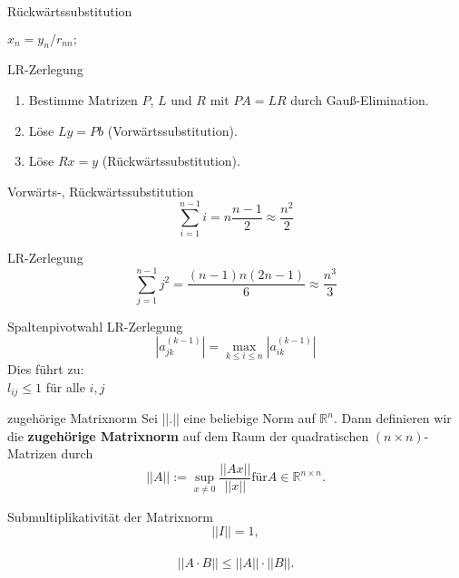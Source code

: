 
\begin{flashcard}[Algorithmus]{Rückwärtssubstitution}
\begin{algorithm}[H]
	$x_n = y_n/r_{nn};$\\
\end{algorithm}
\end{flashcard}

\begin{flashcard}[Algorithmus]{LR-Zerlegung}
\begin{enumerate}
	\item Bestimme Matrizen $P$, $L$ und $R$ mit $PA = LR$ durch Gauß-Elimination.
	\item Löse $Ly = Pb$ (Vorwärtssubstitution).
	\item Löse $Rx = y$ (Rückwärtssubstitution).
\end{enumerate}
\end{flashcard}

\begin{flashcard}[Aufwand]{Vorwärts-, Rückwärtssubstitution}
$$\sum_{i=1}^{n-1}i = n \frac{n-1}{2} \approx \frac{n^2}{2}$$
\end{flashcard}

\begin{flashcard}[Aufwand]{LR-Zerlegung}
$$\sum_{j=1}^{n-1}j^2 = \frac{(n-1)n(2n-1)}{6} \approx \frac{n^3}{3}$$
\end{flashcard}

\begin{flashcard}{Spaltenpivotwahl LR-Zerlegung}
$$|a_{jk}^{(k-1)}| = \max_{k \leq i \leq n} |a_{ik}^{(k-1)}|$$
Dies führt zu:\\
$l_{ij} \leq 1$ für alle $i, j$
\end{flashcard}

\begin{flashcard}[Definition]{zugehörige Matrixnorm}
Sei ||.|| eine beliebige Norm auf $\mathbb{R}^n$. Dann definieren wir die \textbf{zugehörige Matrixnorm} auf dem Raum der quadratischen $(n \times n)$-Matrizen durch
$$||A|| := \sup_{x \neq 0} \frac{||Ax||}{||x||} \text{für} A \in \mathbb{R}^{n \times n} \text{.}$$
\end{flashcard}

\begin{flashcard}{Submultiplikativität der Matrixnorm}
$$||I|| = 1,$$\\
$$||A \cdot B|| \leq ||A|| \cdot ||B||.$$
\end{flashcard}

